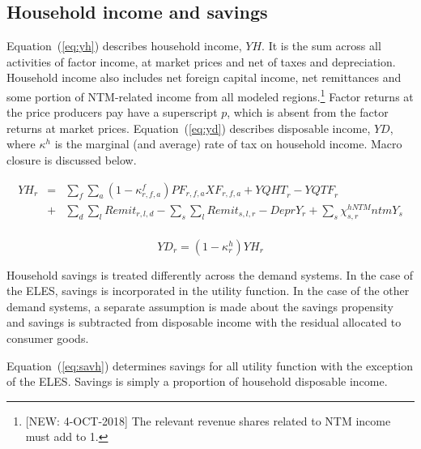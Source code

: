 \documentclass[11pt,letterpaper]{report}
\begin{document}
\subsection{Household income and savings}

Equation~(\ref{eq:yh}) describes household income, $\mathit{YH}$. It is the sum
across all activities of factor income, at market prices and net of taxes and
depreciation. Household income also includes net foreign capital income, net
remittances and some portion of NTM-related income from all modeled
regions.\footnote{[NEW: 4-OCT-2018] The relevant revenue
shares related to NTM income must add to 1.} Factor returns at the price producers pay have a superscript $p$,
which is absent from the factor returns at market prices. Equation~(\ref{eq:yd})
describes disposable income, $\mathit{YD}$, where $\kappa^h$ is the marginal
(and average) rate of tax on household income. Macro closure is discussed below.

\begin{equation}
\label{eq:yh}
\begin{array}{*{20}{l}}
\mathit{YH_{r}} & = &
   \displaystyle \sum_f {\sum_a{
      \left(1 - \kappa^f_{r,f,a}\right) \mathit{PF}_{r,f,a} \mathit{XF}_{r,f,a}
   }}
     + \mathit{YQHT}_r - \mathit{YQTF}_r \\
{} & + & \displaystyle
         \sum_d{\sum_l{\mathit{Remit}_{r,l,d}}}
     -   \sum_s{\sum_l{\mathit{Remit}_{s,l,r}}}  - \mathit{DeprY_r}
     + \sum_s{\chi^{\mathit{hNTM}}_{s,r}\mathit{ntmY_s}} \\
\end{array}
\end{equation}

\begin{equation}
\label{eq:yd}
\mathit{YD_{r}} = \left( 1 - \kappa^h_r \right) \mathit{YH_{r}}
\end{equation}

Household savings is treated differently across the demand systems. In the case
of the ELES, savings is incorporated in the utility function. In the case of the
other demand systems, a separate assumption is made about the savings propensity
and savings is subtracted from disposable income with the residual allocated to
consumer goods.

Equation~(\ref{eq:savh}) determines savings for all utility function with the
exception of the ELES. Savings is simply a proportion of household disposable
income.
\end{document}
